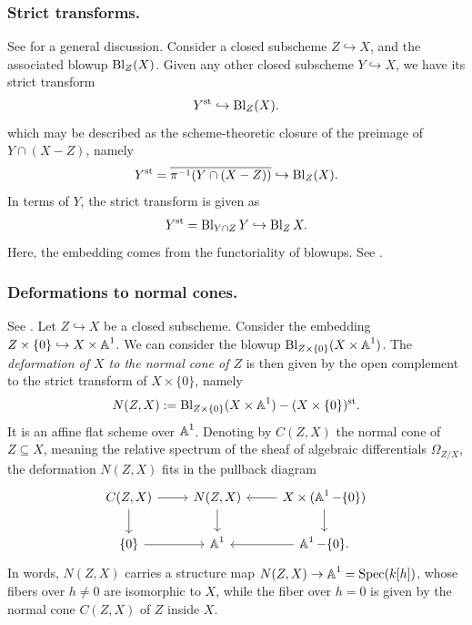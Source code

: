 \subsubsection{Strict transforms.}\label{section: strict transforms}
See \cite[Tag 080C]{Sta} for a general discussion. Consider a closed subscheme $Z \hookrightarrow X$, and the associated blowup $\operatorname{Bl}_Z(X)$. Given any other closed subscheme $Y \hookrightarrow X$, we have its strict transform
\begin{equation*}
    Y^{\mathrm{st}} \hookrightarrow \operatorname{Bl}_Z(X).
\end{equation*}
which may be described as the scheme-theoretic closure of the preimage of $Y \cap (X - Z)$, namely
\begin{equation*}
    Y^{\mathrm{st}} = \overline{\pi^{-1}(Y \cap (X - Z))} \hookrightarrow \operatorname{Bl}_Z(X).
\end{equation*}
%
In terms of $Y$, the strict transform is given as
\begin{equation*}
    Y^{\mathrm{st}} = \operatorname{Bl}_{Y \cap Z} Y \hookrightarrow \operatorname{Bl}_{Z} X.
\end{equation*}
Here, the embedding comes from the functoriality of blowups. See \cite[Tag 080E]{Sta}.



\subsubsection{Deformations to normal cones.}
See \cite[\S 5]{Ful84}.
Let $Z \hookrightarrow X$ be a closed subscheme. Consider the embedding $Z \times \{0\} \hookrightarrow X \times \operatorname{\mathbb{A}}^1$. We can consider the blowup $\operatorname{Bl}_{Z \times \{0\}}(X \times \operatorname{\mathbb{A}}^1)$. The \textit{deformation of $X$ to the normal cone of $Z$} is then given by the open complement to the strict transform of $X \times \{0\}$, namely
\begin{equation*}
    N(Z, X) := \operatorname{Bl}_{Z \times \{0\}}(X \times \operatorname{\mathbb{A}}^1) - (X \times \{0\})^{\mathrm{st}}.
\end{equation*}
%
It is an affine flat scheme over $\operatorname{\mathbb{A}}^1$. Denoting by $C(Z, X)$ the normal cone of $Z \subseteq X$, meaning the relative spectrum of the sheaf of algebraic differentials $\Omega_{Z/X}$, the deformation $N(Z, X)$ fits in the pullback diagram
\begin{equation*}
    \begin{tikzcd}
      C(Z, X) \arrow[d] \arrow[r]&  N(Z,X) \arrow[d] & \arrow[l] \arrow[d] X \times (\A^1 - \{ 0 \}) \\
      \{0\} \arrow[r] & \A^1 & \arrow[l] \A^1 - \{ 0 \}. 
    \end{tikzcd}
\end{equation*}
In words, $N(Z, X)$ carries a structure map $N(Z,X) \to \operatorname{\mathbb{A}}^1 = \operatorname{Spec}(k[h])$, whose fibers over $h \neq 0$ are isomorphic to $X$, while the fiber over $h=0$ is given by the normal cone $C(Z, X)$ of $Z$ inside $X$.


